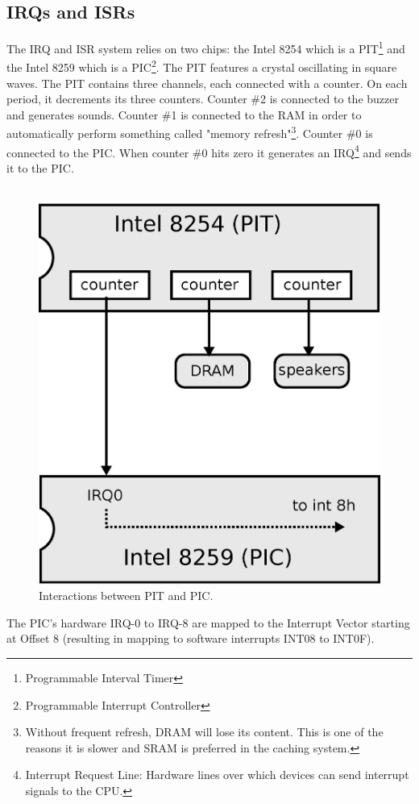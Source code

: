 \documentclass[book.tex]{subfiles}
\begin{document}
\subsection{IRQs and ISRs}
The IRQ and ISR system relies on two chips: the Intel 8254 which is a PIT\footnote{Programmable Interval Timer} and the Intel 8259 which is a PIC\footnote{Programmable Interrupt Controller}. The PIT features a crystal oscillating in square waves. The PIT contains three channels, each connected with a counter. On each period, it decrements its three counters. Counter \#2 is connected to the buzzer and generates sounds. Counter \#1 is connected to the RAM in order to automatically perform something called "memory refresh"\footnote{Without frequent refresh, DRAM will lose its content. This is one of the reasons it is slower and SRAM is preferred in the caching system.}. Counter \#0 is connected to the PIC. 
When counter \#0 hits zero it generates an IRQ\footnote{Interrupt Request Line: Hardware lines over which devices can send interrupt signals to the CPU.} and sends it to the PIC.\\

\
\par
\begin{figure}[H]
  \centering
  \includegraphics[width=.65\textwidth]{imgs/drawings/heatbeats.eps}
  \caption{Interactions between PIT and PIC.}
\end{figure}
\par

The PIC's hardware IRQ-0 to IRQ-8 are mapped to the Interrupt Vector starting at Offset 8 (resulting in mapping to software interrupts INT08 to INT0F). \pagebreak
\end{document}
